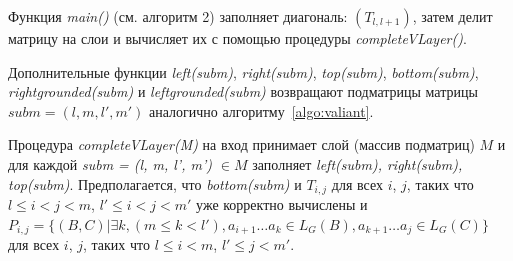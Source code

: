 Функция \textit{main()} (см. алгоритм 2) заполняет диагональ:  $(T_{l, l+1})$, затем делит матрицу на слои и вычисляет их с помощью процедуры \textit{completeVLayer()}.

Дополнительные функции \textit{left(subm)}, \textit{right(subm)}, \textit{top(subm)}, \textit{bottom(subm)}, \textit{rightgrounded(subm)} и \textit{leftgrounded(subm)} возвращают подматрицы матрицы $\textit{subm} = (l, m, l', m')$ аналогично алгоритму~\ref{algo:valiant}.

Процедура \textit{completeVLayer(M)} на вход принимает слой (массив подматриц)  $M$ и для каждой \textit{subm = (l, m, l', m') $\in M$} заполняет \textit{left(subm), right(subm), top(subm)}.
Предполагается, что \textit{bottom(subm)} и $T_{i, j}$ для всех $i$, $j$, таких что $l \leq i < j < m$, $  l' \leq i < j < m'$ уже корректно вычислены и
$P_{i, j} =  \{ (B, C) | \exists k, (m \le k < l'), a_{i + 1} \dots a_{k} \in L_G(B), a_{k + 1} \dots a_{j} \in L_G(C)\} $ для всех $i$, $j$, таких что $l \leq i < m$, $l' \leq j < m'$.


